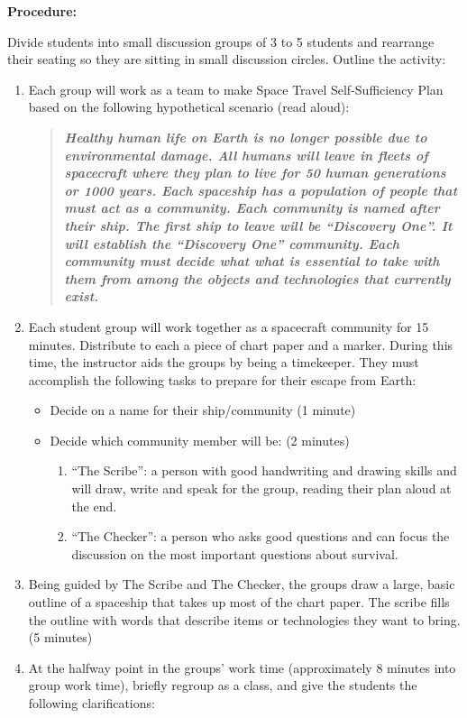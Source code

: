 \documentclass[12pt,]{article}
\providecommand{\tightlist}{%
  \setlength{\itemsep}{0pt}\setlength{\parskip}{0pt}}
\begin{document}
\textbf{Procedure: }

Divide students into small discussion groups of 3 to 5 students and
rearrange their seating so they are sitting in small discussion
circles. Outline the activity:

\begin{enumerate}
\def\labelenumi{\arabic{enumi}.}
\item
  Each group will work as a team to make Space Travel Self-Sufficiency
  Plan based on the following hypothetical scenario (read aloud):

  \begin{quote}
  \textbf{\emph{Healthy human life on Earth is no longer possible due to
  environmental damage. All humans will leave in fleets of spacecraft
  where they plan to live for 50 human generations or 1000 years. Each
  spaceship has a population of people that must act as a community. Each
  community is named after their ship. The first ship to leave will be
  ``Discovery One''. It will establish the ``Discovery One'' community. Each
  community must decide what what is essential to take with them from
  among the objects and technologies that currently exist.}}
  \end{quote}
\item
  Each student group will work together as a spacecraft community for
  15 minutes. Distribute to each a piece of chart paper and a marker.
  During this time, the instructor aids the groups by being a
  timekeeper. They must accomplish the following tasks to prepare for
  their escape from Earth:

  \begin{itemize}
  \tightlist
  \item
    Decide on a name for their ship/community (1 minute)
  \item
    Decide which community member will be: (2 minutes)

    \begin{enumerate}
    \def\labelenumii{\roman{enumii}.}
    \tightlist
    \item
      ``The Scribe'': a person with good handwriting and drawing
      skills and will draw, write and speak for the group, reading
      their plan aloud at the end.
    \item
      ``The Checker'': a person who asks good questions and can
      focus the discussion on the most important questions about
      survival.
    \end{enumerate}
  \end{itemize}
\item
  Being guided by The Scribe and The Checker, the groups draw a large,
  basic outline of a spaceship that takes up most of the chart paper.
  The scribe fills the outline with words that describe items or
  technologies they want to bring. (5 minutes)
\item
  At the halfway point in the groups' work time (approximately 8
  minutes into group work time), briefly regroup as a class, and give
  the students the following clarifications:


\end{enumerate}
\end{document}
